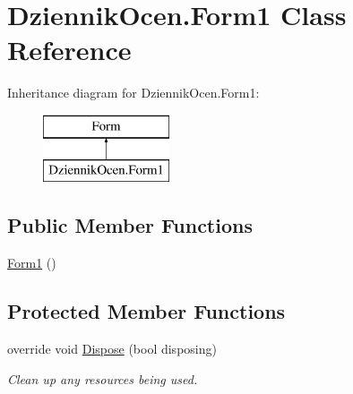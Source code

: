 \hypertarget{class_dziennik_ocen_1_1_form1}{}\section{Dziennik\+Ocen.\+Form1 Class Reference}
\label{class_dziennik_ocen_1_1_form1}
Inheritance diagram for Dziennik\+Ocen.\+Form1\+:\begin{figure}[H]
\begin{center}
\leavevmode
\includegraphics[height=2.000000cm]{class_dziennik_ocen_1_1_form1}
\end{center}
\end{figure}
\subsection*{Public Member Functions}
\begin{DoxyCompactItemize}
\item 
\hyperlink{class_dziennik_ocen_1_1_form1_a494b133ac4b159fcfc42561ce2c72002}{Form1} ()
\end{DoxyCompactItemize}
\subsection*{Protected Member Functions}
\begin{DoxyCompactItemize}
\item 
override void \hyperlink{class_dziennik_ocen_1_1_form1_a64a7924e831567e78bb499a6baa0e543}{Dispose} (bool disposing)
\begin{DoxyCompactList}\small\item\em Clean up any resources being used. \end{DoxyCompactList}\end{DoxyCompactItemize}
